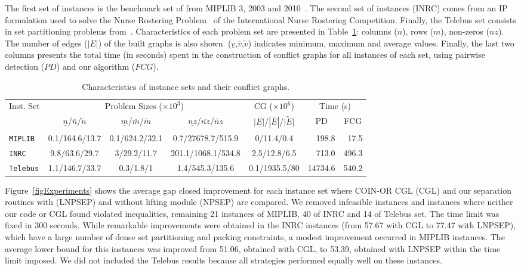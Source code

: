 \documentclass{endm}
\begin{document}
The first set of instances is the benchmark set of from MIPLIB 3, 2003 and 2010~\cite{miplib}. The second set of instances (INRC) comes from an IP formulation  used to solve the Nurse Rostering Problem~\cite{Santos2014} of the International Nurse Rostering Competition. Finally, the Telebus set consists in set partitioning problems from~\cite{Borndorfer1998}. Characteristics of each problem set are presented in Table~\ref{tab:inst}: columns ($n$), rows ($m$), non-zeros ($nz$). The number of edges ($|E|$) of the built graphs is also shown. ($\underline{v}$,$\overline{v}$,$\tilde{v}$) indicates minimum, maximum and average values. Finally, the last two columns presents the total time (in seconds) spent in the construction of conflict graphs for all instances of each set, using pairwise detection ($PD$) and our algorithm ($FCG$).

\begin{table}[h]
\scriptsize
\caption{Characteristics of instance sets and their conflict graphs.}\label{tab:inst}
\begin{center}
\begin{tabular}{|l|c|c|c|c|r|r|}
\hline 
\multirow{2}{0.8cm}{Inst. Set} & \multicolumn{3}{c|}{{Problem Sizes ($\times10^{3}$)}} & {CG ($\times10^{6}$)} & \multicolumn{2}{c|}{{Time (s)}}\tabularnewline
\cline{2-7} 
 & {$\underline{n}$/$\overline{n}$/$\tilde{n}$} & {$\underline{m}$/$\overline{m}$/$\tilde{m}$} & {$\underline{nz}$/$\overline{nz}$/$\tilde{nz}$} & {$|\underline{E}|$/$|\overline{E}|$/$\tilde{|E|}$} & \multicolumn{1}{c|}{PD} & \multicolumn{1}{c|}{FCG}\tabularnewline
\hline 
\hline 
\texttt{MIPLIB} & {0.1/164.6/13.7} & {0.1/624.2/32.1} & {0.7/27678.7/515.9} & {0/11.4/0.4} & {198.8} & {17.5}\tabularnewline
\hline 
\texttt{INRC} & {9.8/63.6/29.7} & {3/29.2/11.7} & {201.1/1068.1/534.8} & {2.5/12.8/6.5} & {713.0} & {496.3}\tabularnewline
\hline 
\texttt{Telebus} & {1.1/146.7/33.7} & {0.3/1.8/1} & {1.4/545.3/135.6} & {0.1/1935.5/80} & {14734.6} & {540.2}\tabularnewline
\hline 
\end{tabular}
\end{center}
\end{table}

Figure~\ref{figExperiments} shows the average gap closed improvement for each instance set where COIN-OR CGL (CGL) and our separation routines with (LNPSEP) and without lifting module (NPSEP) are compared. We removed infeasible instances and instances where neither our code or CGL found violated inequalities, remaining 21 instances of MIPLIB, 40 of INRC and 14 of Telebus set. The time limit was fixed in 300 seconds. While remarkable improvements were obtained in the INRC instances (from 57.67 with CGL to 77.47 with LNPSEP), which have a large number of dense set partitioning and packing constraints, a modest improvement occurred in MIPLIB instances. The average lower bound for this instances was improved from 51.06, obtained with CGL, to 53.39, obtained with LNPSEP within the time limit imposed. We did not included the Telebus results because all strategies performed equally well on these instances.
\end{document}
